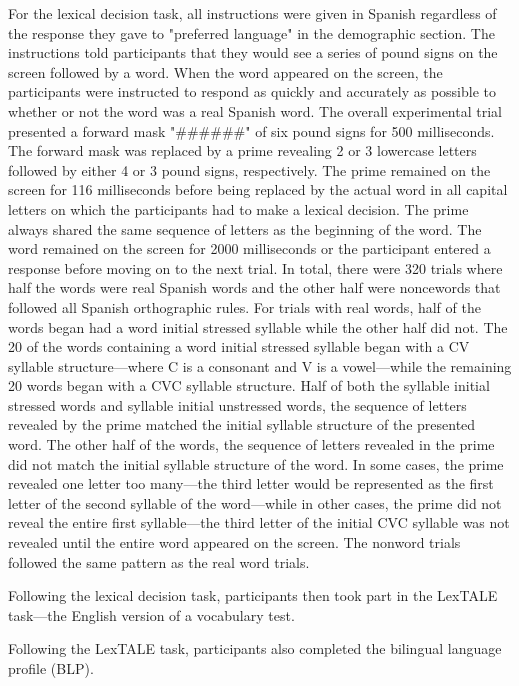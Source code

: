 For the lexical decision task, all instructions were given in Spanish regardless of the response they gave to "preferred language" in the demographic section. The instructions told participants that they would see a series of pound signs on the screen followed by a word. When the word appeared on the screen, the participants were instructed to respond as quickly and accurately as possible to whether or not the word was a real Spanish word. The overall experimental trial presented a forward mask "\#\#\#\#\#\#" of six pound signs for 500 milliseconds. The forward mask was replaced by a prime revealing 2 or 3 lowercase letters followed by either 4 or 3 pound signs, respectively. The prime remained on the screen for 116 milliseconds before being replaced by the actual word in all capital letters on which the participants had to make a lexical decision. The prime always shared the same sequence of letters as the beginning of the word. The word remained on the screen for 2000 milliseconds or the participant entered a response before moving on to the next trial. In total, there were 320 trials where half the words were real Spanish words and the other half were noncewords that followed all Spanish orthographic rules. For trials with real words, half of the words began had a word initial stressed syllable while the other half did not. The 20 of the words containing a word initial stressed syllable began with a CV syllable structure---where C is a consonant and V is a vowel---while the remaining 20 words began with a CVC syllable structure. Half of both the syllable initial stressed words and syllable initial unstressed words, the sequence of letters revealed by the prime matched the initial syllable structure of the presented word. The other half of the words, the sequence of letters revealed in the prime did not match the initial syllable structure of the word. In some cases, the prime revealed one letter too many---the third letter would be represented as the first letter of the second syllable of the word---while in other cases, the prime did not reveal the entire first syllable---the third letter of the initial CVC syllable was not revealed until the entire word appeared on the screen. The nonword trials followed the same pattern as the real word trials.

Following the lexical decision task, participants then took part in the LexTALE task---the English version of a vocabulary test.

Following the LexTALE task, participants also completed the bilingual language profile (BLP).

